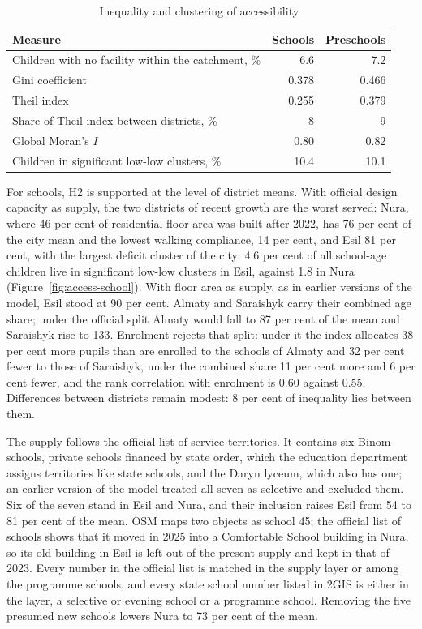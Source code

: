 \begin{table}[ht]
\centering
\caption{Inequality and clustering of accessibility}
\label{tab:inequality}
\small
\begin{tabular}{lrr}
\toprule
Measure & Schools & Preschools \\
\midrule
Children with no facility within the catchment, \% & 6.6 & 7.2 \\
Gini coefficient & 0.378 & 0.466 \\
Theil index & 0.255 & 0.379 \\
Share of Theil index between districts, \% & 8 & 9 \\
Global Moran's $I$ & 0.80 & 0.82 \\
Children in significant low-low clusters, \% & 10.4 & 10.1 \\
\bottomrule
\end{tabular}
\end{table}

For schools, H2 is supported at the level of district means. With official design capacity as supply, the two districts of recent growth are the worst served: Nura, where 46 per cent of residential floor area was built after 2022, has 76 per cent of the city mean and the lowest walking compliance, 14 per cent, and Esil 81 per cent, with the largest deficit cluster of the city: 4.6 per cent of all school-age children live in significant low-low clusters in Esil, against 1.8 in Nura (Figure~\ref{fig:access-school}). With floor area as supply, as in earlier versions of the model, Esil stood at 90 per cent. Almaty and Saraishyk carry their combined age share; under the official split Almaty would fall to 87 per cent of the mean and Saraishyk rise to 133. Enrolment rejects that split: under it the index allocates 38 per cent more pupils than are enrolled to the schools of Almaty and 32 per cent fewer to those of Saraishyk, under the combined share 11 per cent more and 6 per cent fewer, and the rank correlation with enrolment is 0.60 against 0.55. Differences between districts remain modest: 8 per cent of inequality lies between them.

The supply follows the official list of service territories. It contains six Binom schools, private schools financed by state order, which the education department assigns territories like state schools, and the Daryn lyceum, which also has one; an earlier version of the model treated all seven as selective and excluded them. Six of the seven stand in Esil and Nura, and their inclusion raises Esil from 54 to 81 per cent of the mean. OSM maps two objects as school 45; the official list of schools shows that it moved in 2025 into a Comfortable School building in Nura, so its old building in Esil is left out of the present supply and kept in that of 2023. Every number in the official list is matched in the supply layer or among the programme schools, and every state school number listed in 2GIS \cite{twogis2026} is either in the layer, a selective or evening school or a programme school. Removing the five presumed new schools lowers Nura to 73 per cent of the mean.

